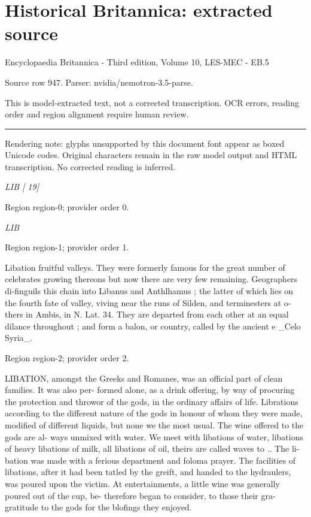 \documentclass[11pt]{article}
\begin{document}
\section*{Historical Britannica: extracted source}
Encyclopaedia Britannica - Third edition, Volume 10, LES-MEC - EB.5\par
{\small Source row 947. Parser: nvidia/nemotron-3.5-parse.\par}
{\small This is model-extracted text, not a corrected transcription. OCR errors, reading order and region alignment require human review.\par}
\hrule\medskip
{\small\color{red} Rendering note: glyphs unsupported by this document font appear as boxed Unicode codes. Original characters remain in the raw model output and HTML transcription. No corrected reading is inferred.\par}

{\small\itshape LIB [ 19]\par}

{\scriptsize\color{gray} Region region-0; provider order 0.\par}
\medskip

{\small\itshape LIB\par}

{\scriptsize\color{gray} Region region-1; provider order 1.\par}
\medskip

Libation fruitful valleys. They were formerly famous for the great number of celebrates growing thereons but now there are very few remaining. Geographers di-finguils this chain into Libanus and Anthlhamus ; the latter of which lies on the fourth fate of valley, viving near the runs of Silden, and terminesters at o-thers in Ambis, in N. Lat. 34. They are departed from each other at an equal dilance throughout ; and form a balon, or country, called by the ancient e \_Celo Syria\_.
\par

{\scriptsize\color{gray} Region region-2; provider order 2.\par}
\medskip

LIBATION, amongst the Greeks and Romanes, was an official part of clean families. It was also per- formed alone, as a drink offering, by way of procuring the protection and throwor of the gods, in the ordinary affairs of life. Librations according to the different nature of the gods in honour of whom they were made, modified of different liquids, but none we the most usual. The wine offered to the gods are al- ways unmixed with water. We meet with libations of water, libations of heavy libations of milk, all libations of oil, theirs are called waves to .. The li- bation was made with a ferious department and foloma prayer. The facilities of libations, after it had been tatled by the greift, and handed to the hydraulers, was poured upon the victim. At entertainments, a little wine was generally poured out of the cup, be- therefore began to consider, to those their gra- gratitude to the gods for the blofings they enjoyed.
\par
\end{document}
